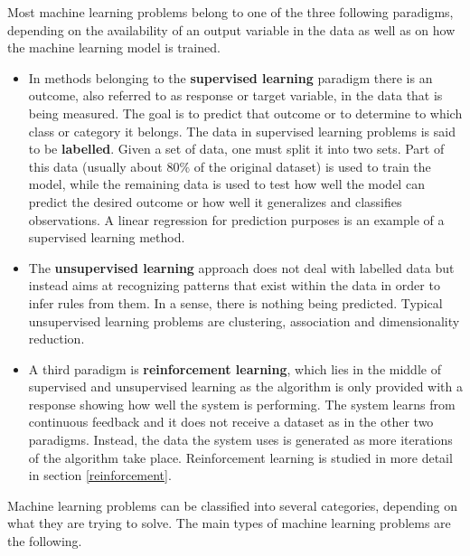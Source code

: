 \documentclass[11pt]{article}
\theoremstyle{definition}
\begin{document}
Most machine learning problems belong to one of the three following paradigms, depending on the availability of an output variable in the data as well as on how the machine learning model is trained. 

\begin{itemize}[label=\raisebox{0.25ex}{\tiny$\bullet$}]
    \item In methods belonging to the \textbf{supervised learning} paradigm there is an outcome, also referred to as response or target variable, in the data that is being measured. The goal is to predict that outcome or to determine to which class or category it belongs. The data in supervised learning problems is said to be \textbf{labelled}. Given a set of data, one must split it into two sets. Part of this data (usually about $80\%$ of the original dataset) is used to train the model, while the remaining data is used to test how well the model can predict the desired outcome or how well it generalizes and classifies observations. A linear regression for prediction purposes is an example of a supervised learning method.
    
    \item The \textbf{unsupervised learning} approach does not deal with labelled data but instead aims at recognizing patterns that exist within the data in order to infer rules from them. In a sense, there is nothing being predicted. Typical unsupervised learning problems are clustering, association and dimensionality reduction.
    
    \item A third paradigm is \textbf{reinforcement learning}, which lies in the middle of supervised and unsupervised learning as the algorithm is only provided with a response showing how well the system is performing. The system learns from continuous feedback and it does not receive a dataset as in the other two paradigms. Instead, the data the system uses is generated as more iterations of the algorithm take place. Reinforcement learning is studied in more detail in section \ref{reinforcement}.
\end{itemize}

Machine learning problems can be classified into several categories, depending on what they are trying to solve. The main types of machine learning problems are the following.
\end{document}
